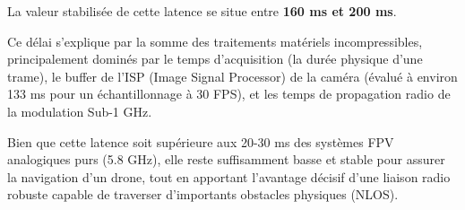 La valeur stabilisée de cette latence se situe entre \textbf{160 ms et 200 ms}.

Ce délai s'explique par la somme des traitements matériels incompressibles, principalement dominés par le temps 
d'acquisition (la durée physique d'une trame), le buffer de l'ISP (Image Signal Processor) de la caméra 
(évalué à environ 133 ms pour un échantillonnage à 30 FPS), et les temps de propagation radio de la modulation 
Sub-1 GHz.

Bien que cette latence soit supérieure aux 20-30 ms des systèmes FPV analogiques purs (5.8 GHz), elle reste 
suffisamment basse et stable pour assurer la navigation d'un drone, tout en apportant l'avantage décisif d'une 
liaison radio robuste capable de traverser d'importants obstacles physiques (NLOS).